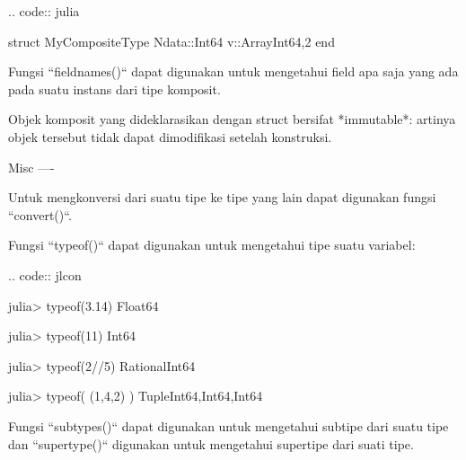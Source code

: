 .. code:: julia

  struct MyCompositeType
    Ndata::Int64
    v::Array{Int64,2}
  end


Fungsi ``fieldnames()`` dapat digunakan untuk mengetahui field apa saja
yang ada pada suatu instans dari tipe komposit.

Objek komposit yang dideklarasikan dengan struct bersifat *immutable*: artinya
objek tersebut tidak dapat dimodifikasi setelah konstruksi.


Misc
----

Untuk mengkonversi dari suatu tipe ke tipe yang lain dapat digunakan
fungsi ``convert()``.

Fungsi ``typeof()`` dapat digunakan untuk mengetahui tipe suatu variabel:


.. code:: jlcon

  julia> typeof(3.14)
  Float64

  julia> typeof(11)
  Int64

  julia> typeof(2//5)
  Rational{Int64}

  julia> typeof( (1,4,2) )
  Tuple{Int64,Int64,Int64}


Fungsi ``subtypes()`` dapat digunakan untuk mengetahui subtipe dari suatu tipe
dan ``supertype()`` digunakan untuk mengetahui supertipe dari suati tipe.
